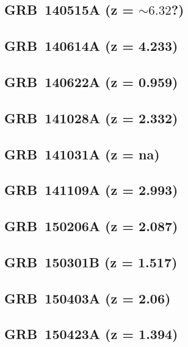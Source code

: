 \documentclass{aa}    %
\begin{document}
\subsection{GRB~140515A (z = $\sim6.32$?)}	



\subsection{GRB~140614A (z = 4.233)}	



\subsection{GRB~140622A (z = 0.959)}	



\subsection{GRB~141028A (z = 2.332)}	



\subsection{GRB~141031A  (z = na)}	



\subsection{GRB~141109A (z = 2.993)}	



\subsection{GRB~150206A (z = 2.087)}	



\subsection{GRB~150301B (z = 1.517)}	



\subsection{GRB~150403A (z = 2.06)}	



\subsection{GRB~150423A (z = 1.394)}	
\end{document}
